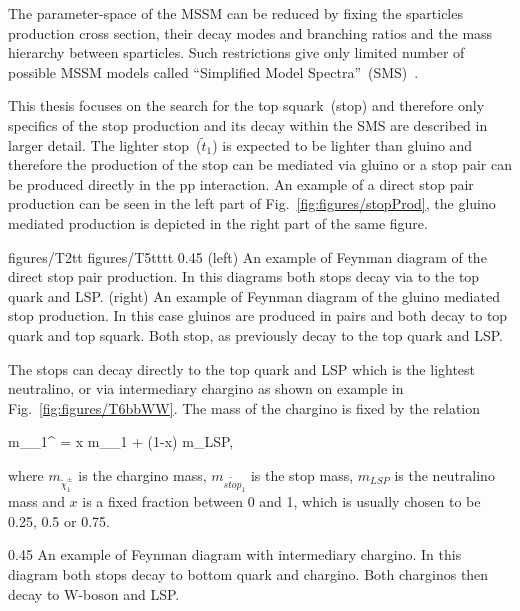 The parameter-space of the MSSM can be reduced by fixing the sparticles production cross section, their decay modes and branching ratios and the mass hierarchy between sparticles. Such restrictions give only limited number of possible MSSM models called ``Simplified Model Spectra''~(SMS)~\cite{Alves:2011wf, Alwall:2008ag, Chatrchyan:2013sza}.

This thesis focuses on the search for the top squark~(stop) and therefore only specifics of the stop production and its decay within the SMS are described in larger detail. The lighter stop~($\tilde{t}_{1}$) is expected to be lighter than gluino and therefore the production of the stop can be mediated via gluino or a stop pair can be produced directly in the pp interaction. An example of a direct stop pair production can be seen in the left part of Fig.~\ref{fig:figures/stopProd}, the gluino mediated production is depicted in the right part of the same figure.


                 {figures/T2tt}
                 {figures/T5tttt} %
                 {0.45}       %
                 {(left) An example of Feynman diagram of the direct stop pair production. In this diagrams both stops decay via to the top quark and LSP. (right)  An example of Feynman diagram of the gluino mediated stop production. In this case gluinos are produced in pairs and both decay to top quark and top squark. Both stop, as previously decay to the top quark and LSP. } %

The stops can decay directly to the top quark and LSP which is the lightest neutralino, or via intermediary chargino as shown on example in Fig.~\ref{fig:figures/T6bbWW}. The mass of the chargino is fixed by the relation

{
m_{\tilde{\chi}_{1}^{\pm}} = x m_{_{1}} + (1-x) m_{LSP},
}

where $m_{\tilde{\chi}_{1}^{\pm}}$ is the chargino mass, $m_{\tilde{stop}_{1}}$ is the stop mass, $m_{LSP}$ is the neutralino mass and $x$ is a fixed fraction between 0 and 1, which is usually chosen to be 0.25, 0.5 or 0.75. 

                 {0.45}       %
                 {An example of Feynman diagram with intermediary chargino. In this diagram both stops decay to bottom quark and chargino. Both charginos then decay to W-boson and LSP.   } %

